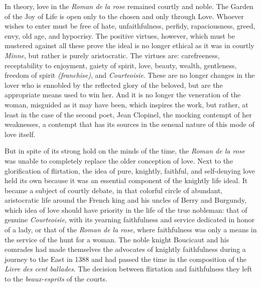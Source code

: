 In theory, love in the \emph{Roman de la rose} remained courtly and
noble. The Garden of the Joy of Life is open only to the chosen and only
through Love. Whoever wishes to enter must be free of hate,
unfaithfulness, perfidy, rapaciousness, greed, envy, old age, and
hypocrisy. The positive virtues, however, which must be mustered against
all these prove the ideal is no longer ethical as it was in courtly
\emph{Minne}, but rather is purely aristocratic. The virtues are:
carefreeness, receptability to enjoyment, gaiety of spirit, love,
beauty, wealth, gentleness, freedom of spirit \emph{(franchise)}, and
\emph{Courteoisie}. These are no longer changes in the lover who is
ennobled by the reflected glory of the beloved, but are the appropriate
means used to win her. And it is no longer the veneration of the woman,
misguided as it may have been, which inspires the work, but rather,
\protect\hypertarget{11_Chapter_Four__THE_FORMS_OF_LOVE.xhtmlux5cux23page_137}{}{}at
least in the case of the second poet, Jean Clopinel, the mocking
contempt of her weaknesses, a contempt that has its sources in the
sensual nature of this mode of love itself.

But in spite of its strong hold on the minds of the time, the
\emph{Roman de la rose} was unable to completely replace the older
conception of love. Next to the glorification of flirtation, the idea of
pure, knightly, faithful, and self-denying love held its own because it
was an essential component of the knightly life ideal. It became a
subject of courtly debate, in that colorful circle of abundant,
aristocratic life around the French king and his uncles of Berry and
Burgundy, which idea of love should have priority in the life of the
true nobleman: that of genuine \emph{Courteoisie}, with its yearning
faithfulness and service dedicated in honor of a lady, or that of the
\emph{Roman de la rose}, where faithfulness was only a means in the
service of the hunt for a woman. The noble knight Boucicaut and his
comrades had made themselves the advocates of knightly faithfulness
during a journey to the East in 1388 and had passed the time in the
composition of the \emph{Livre des cent ballades}. The decision between
flirtation and faithfulness they left to the \emph{beaux-esprits} of the
courts.

